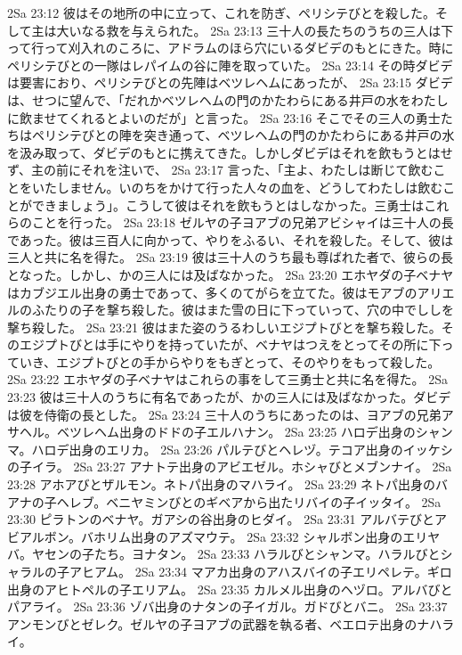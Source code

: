 2Sa 23:12  彼はその地所の中に立って、これを防ぎ、ペリシテびとを殺した。そして主は大いなる救を与えられた。
2Sa 23:13  三十人の長たちのうちの三人は下って行って刈入れのころに、アドラムのほら穴にいるダビデのもとにきた。時にペリシテびとの一隊はレパイムの谷に陣を取っていた。
2Sa 23:14  その時ダビデは要害におり、ペリシテびとの先陣はベツレヘムにあったが、
2Sa 23:15  ダビデは、せつに望んで、「だれかベツレヘムの門のかたわらにある井戸の水をわたしに飲ませてくれるとよいのだが」と言った。
2Sa 23:16  そこでその三人の勇士たちはペリシテびとの陣を突き通って、ベツレヘムの門のかたわらにある井戸の水を汲み取って、ダビデのもとに携えてきた。しかしダビデはそれを飲もうとはせず、主の前にそれを注いで、
2Sa 23:17  言った、「主よ、わたしは断じて飲むことをいたしません。いのちをかけて行った人々の血を、どうしてわたしは飲むことができましょう」。こうして彼はそれを飲もうとはしなかった。三勇士はこれらのことを行った。
2Sa 23:18  ゼルヤの子ヨアブの兄弟アビシャイは三十人の長であった。彼は三百人に向かって、やりをふるい、それを殺した。そして、彼は三人と共に名を得た。
2Sa 23:19  彼は三十人のうち最も尊ばれた者で、彼らの長となった。しかし、かの三人には及ばなかった。
2Sa 23:20  エホヤダの子ベナヤはカブジエル出身の勇士であって、多くのてがらを立てた。彼はモアブのアリエルのふたりの子を撃ち殺した。彼はまた雪の日に下っていって、穴の中でししを撃ち殺した。
2Sa 23:21  彼はまた姿のうるわしいエジプトびとを撃ち殺した。そのエジプトびとは手にやりを持っていたが、ベナヤはつえをとってその所に下っていき、エジプトびとの手からやりをもぎとって、そのやりをもって殺した。
2Sa 23:22  エホヤダの子ベナヤはこれらの事をして三勇士と共に名を得た。
2Sa 23:23  彼は三十人のうちに有名であったが、かの三人には及ばなかった。ダビデは彼を侍衛の長とした。
2Sa 23:24  三十人のうちにあったのは、ヨアブの兄弟アサヘル。ベツレヘム出身のドドの子エルハナン。
2Sa 23:25  ハロデ出身のシャンマ。ハロデ出身のエリカ。
2Sa 23:26  パルテびとヘレヅ。テコア出身のイッケシの子イラ。
2Sa 23:27  アナトテ出身のアビエゼル。ホシャびとメブンナイ。
2Sa 23:28  アホアびとザルモン。ネトパ出身のマハライ。
2Sa 23:29  ネトパ出身のバアナの子ヘレブ。ベニヤミンびとのギベアから出たリバイの子イッタイ。
2Sa 23:30  ピラトンのベナヤ。ガアシの谷出身のヒダイ。
2Sa 23:31  アルバテびとアビアルボン。バホリム出身のアズマウテ。
2Sa 23:32  シャルボン出身のエリヤバ。ヤセンの子たち。ヨナタン。
2Sa 23:33  ハラルびとシャンマ。ハラルびとシャラルの子アヒアム。
2Sa 23:34  マアカ出身のアハスバイの子エリペレテ。ギロ出身のアヒトペルの子エリアム。
2Sa 23:35  カルメル出身のヘヅロ。アルバびとパアライ。
2Sa 23:36  ゾバ出身のナタンの子イガル。ガドびとバニ。
2Sa 23:37  アンモンびとゼレク。ゼルヤの子ヨアブの武器を執る者、ベエロテ出身のナハライ。

